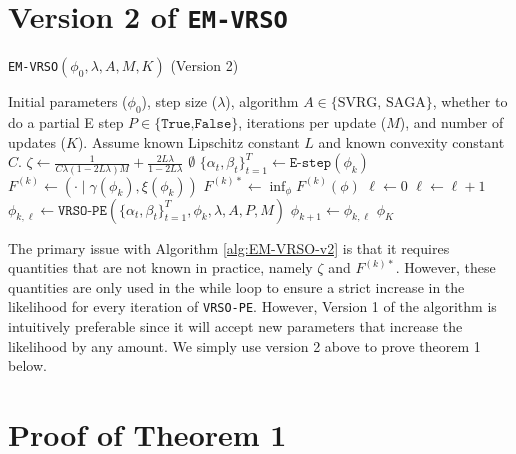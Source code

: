 \section{Version 2 of \texttt{EM-VRSO}}

\begin{algorithm}
\caption{\texttt{EM-VRSO}$(\phi_0,\lambda, A, M, K)$ (Version 2)}\label{alg:EM-VRSO-v2}
\begin{algorithmic}[1]
\Require Initial parameters ($\phi_{0}$), step size ($\lambda$), algorithm $A \in \{\text{SVRG, SAGA}\}$, whether to do a partial E step $P \in \{\texttt{True,False}\}$, iterations per update ($M$), and number of updates ($K$). Assume known Lipschitz constant $L$ and known convexity constant $C$.
%
\vspace{5pt}
%
\State $\zeta \gets \frac{1}{C \lambda(1-2L\lambda)M} + \frac{2L\lambda}{1-2L\lambda}$
%
    \State \Return $\emptyset$ 
\EndIf
%
% 
\State $\{\alpha_t,\beta_t\}_{t=1}^{T} \gets \texttt{E-step}(\phi_{k})$ 
%
\State $F^{(k)} \gets (\cdot \mid \gamma(\phi_k), \xi(\phi_k))$
%
\State $F^{(k)*} \gets \inf_{\phi} F^{(k)}(\phi)$
%
\State $\ell \gets 0$
%
 
\State $\ell \gets \ell+1$
\State $\phi_{k,\ell} \gets \texttt{VRSO-PE}(\{\alpha_t,\beta_t\}_{t=1}^{T},\phi_{k},\lambda,A,P,M)$
%
\EndWhile
\State $\phi_{k+1} \gets \phi_{k,\ell}$
\EndFor
\State \Return $\phi_K$
\end{algorithmic}
\end{algorithm}

The primary issue with Algorithm \ref{alg:EM-VRSO-v2} is that it requires quantities that are not known in practice, namely $\zeta$ and $F^{(k)*}$. However, these quantities are only used in the while loop to ensure a strict increase in the likelihood for every iteration of \texttt{VRSO-PE}. However, Version 1 of the algorithm is intuitively preferable since it will accept new parameters that increase the likelihood by any amount. We simply use version 2 above to prove theorem 1 below.

\section{Proof of Theorem 1}

